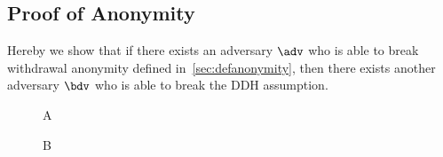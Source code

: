 \documentclass[a4paper]{article}
\theoremstyle{definition}
\begin{document}
\newpage
\begin{appendices}

\section{Proof of Anonymity} \label{appendanon}
Hereby we show that if there exists an adversary $\adv$ who is able to break withdrawal anonymity defined in~\ref{sec:defanonymity}, then there exists another adversary $\bdv$ who is able to break the DDH assumption.

\begin{wrapfigure}{r}{0.5\textwidth}
	\centering
\begin{bbrenv}{A}
 \begin{bbrbox} [name=\bdv]

 \begin{bbrenv}{B}
 \begin{bbrbox}[name=\adv]
 \end{bbrbox}
 
 \end{bbrenv}
 
 \end{bbrbox}
 
\end{bbrenv}

\end{wrapfigure}


\end{appendices}
\end{document}
